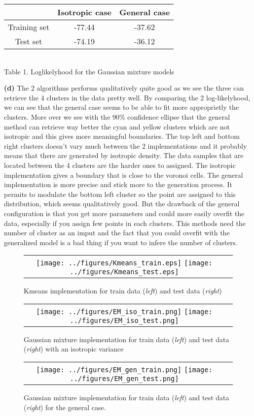 \documentclass[10pt]{article}
\begin{document}
\begin{center}
\begin{tabular}{ | c|c|c|}
\hline
& Isotropic case & General case \\\hline
Training set & -77.44 & -37.62\\\hline
Test set & -74.19 & -36.12 \\\hline
\end{tabular}\\
Table 1. Loglikelyhood for the Gaussian mixture models
\end{center}

\textbf{(d)} The 2 algorithms performs qualitatively quite good as we see the three can retrieve the 4 clusters in the data pretty well. By comparing the 2 log-likelyhood, we can see that the general case seems to be able to fit more approprietly the clusters. More over we see with the 90\% confidence ellipse that the general method can retrieve way better the cyan and yellow clusters which are not isotropic and this gives more meaningful boundaries. The top left and bottom right clusters doesn't vary much between the 2 implementations and it probably means that there are generated by isotropic density. The data samples that are located between the 4 clusters are the harder ones to assigned. The isotropic implementation gives a boundary that is close to the voronoi cells. The general implementation is more precise and stick more to the generation process. It permits to modulate the bottom left cluster so the point are assigned to this distribution, which seems qualitatively good. But the drawback of the general configuration is that you get more parameters and could more easily overfit the data, especially if you assign few points in each clusters. This methods need the number of cluster as an imput and the fact that you could overfit with the generalized model is a bad thing if you want to infere the number of clusters.


\begin{figure}
\begin{tabular}{c c}
\texttt{[image: ../figures/Kmeans\_train.eps]}
\texttt{[image: ../figures/Kmeans\_test.eps]}
\end{tabular}
\caption{Kmeans implementation for train data (\emph{left}) and test data (\emph{right})}
\label{IIa}

\begin{tabular}{c c}
\texttt{[image: ../figures/EM\_iso\_train.png]}
\texttt{[image: ../figures/EM\_iso\_test.png]}
\end{tabular}
\caption{Gaussian mixture implementation for train data (\emph{left}) and test data (\emph{right}) with an isotropic variance}

\begin{tabular}{c c}
\texttt{[image: ../figures/EM\_gen\_train.png]}
\texttt{[image: ../figures/EM\_gen\_test.png]}
\end{tabular}
\caption{Gaussian mixture implementation for train data (\emph{left}) and test data (\emph{right}) for the general case.}
\end{figure}
\end{document}
